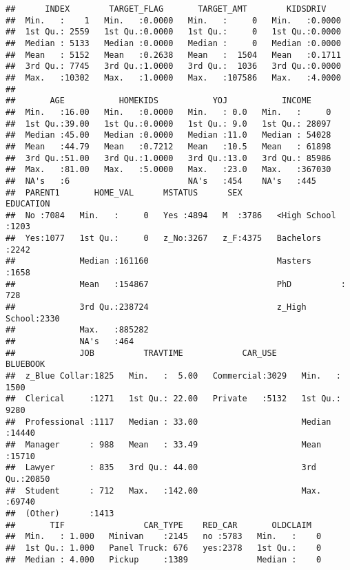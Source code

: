 \documentclass[]{article}
\begin{document}
\begin{verbatim}
##      INDEX        TARGET_FLAG       TARGET_AMT        KIDSDRIV     
##  Min.   :    1   Min.   :0.0000   Min.   :     0   Min.   :0.0000  
##  1st Qu.: 2559   1st Qu.:0.0000   1st Qu.:     0   1st Qu.:0.0000  
##  Median : 5133   Median :0.0000   Median :     0   Median :0.0000  
##  Mean   : 5152   Mean   :0.2638   Mean   :  1504   Mean   :0.1711  
##  3rd Qu.: 7745   3rd Qu.:1.0000   3rd Qu.:  1036   3rd Qu.:0.0000  
##  Max.   :10302   Max.   :1.0000   Max.   :107586   Max.   :4.0000  
##                                                                    
##       AGE           HOMEKIDS           YOJ           INCOME      
##  Min.   :16.00   Min.   :0.0000   Min.   : 0.0   Min.   :     0  
##  1st Qu.:39.00   1st Qu.:0.0000   1st Qu.: 9.0   1st Qu.: 28097  
##  Median :45.00   Median :0.0000   Median :11.0   Median : 54028  
##  Mean   :44.79   Mean   :0.7212   Mean   :10.5   Mean   : 61898  
##  3rd Qu.:51.00   3rd Qu.:1.0000   3rd Qu.:13.0   3rd Qu.: 85986  
##  Max.   :81.00   Max.   :5.0000   Max.   :23.0   Max.   :367030  
##  NA's   :6                        NA's   :454    NA's   :445     
##  PARENT1       HOME_VAL      MSTATUS      SEX               EDUCATION   
##  No :7084   Min.   :     0   Yes :4894   M  :3786   <High School :1203  
##  Yes:1077   1st Qu.:     0   z_No:3267   z_F:4375   Bachelors    :2242  
##             Median :161160                          Masters      :1658  
##             Mean   :154867                          PhD          : 728  
##             3rd Qu.:238724                          z_High School:2330  
##             Max.   :885282                                              
##             NA's   :464                                                 
##             JOB          TRAVTIME            CAR_USE        BLUEBOOK    
##  z_Blue Collar:1825   Min.   :  5.00   Commercial:3029   Min.   : 1500  
##  Clerical     :1271   1st Qu.: 22.00   Private   :5132   1st Qu.: 9280  
##  Professional :1117   Median : 33.00                     Median :14440  
##  Manager      : 988   Mean   : 33.49                     Mean   :15710  
##  Lawyer       : 835   3rd Qu.: 44.00                     3rd Qu.:20850  
##  Student      : 712   Max.   :142.00                     Max.   :69740  
##  (Other)      :1413                                                     
##       TIF                CAR_TYPE    RED_CAR       OLDCLAIM    
##  Min.   : 1.000   Minivan    :2145   no :5783   Min.   :    0  
##  1st Qu.: 1.000   Panel Truck: 676   yes:2378   1st Qu.:    0  
##  Median : 4.000   Pickup     :1389              Median :    0  

\end{verbatim}
\end{document}
